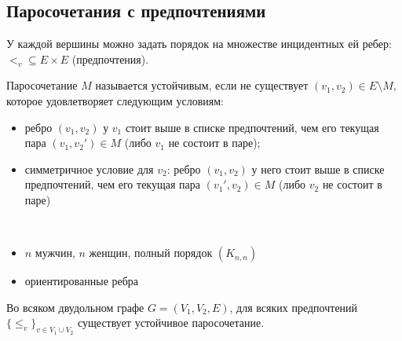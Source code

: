 \subsection{Паросочетания с предпочтениями}

\begin{defn}
    У каждой вершины можно задать порядок на множестве инцидентных ей ребер: $<_v \subseteq E \times E$ (предпочтения).
\end{defn}

\begin{defn}
    Паросочетание $M$ называется устойчивым, если не существует $(v_1, v_2) \in E \setminus M$, которое удовлетворяет следующим условиям:
    
    \begin{itemize}
        \item ребро $(v_1, v_2)$ у $v_1$ стоит выше в списке предпочтений, чем его текущая пара $(v_1, v_2') \in M$ (либо $v_1$ не состоит в паре);
        
        \item симметричное условие для $v_2$: ребро $(v_1, v_2)$ у него стоит выше в списке предпочтений, чем его текущая пара $(v_1', v_2) \in M$ (либо $v_2$ не состоит в паре)
    \end{itemize}
\end{defn}

\begin{examples}~
    \begin{itemize}
        \item $n$ мужчин, $n$ женщин, полный порядок $(K_{n,n})$
       
        \item ориентированные ребра
    \end{itemize}
\end{examples}

\begin{theorem}
    Во всяком двудольном графе $G = (V_1, V_2, E)$, для всяких предпочтений $\{\leq_v\}_{v \in V_1 \cup V_2}$ существует устойчивое паросочетание.
\end{theorem}

